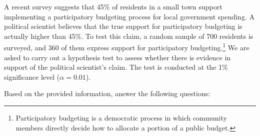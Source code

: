 \documentclass{article}
\begin{document}
A recent survey suggests that 45\% of residents in a small town support implementing a participatory budgeting process for local government spending. A political scientist believes that the true support for participatory budgeting is actually higher than 45\%. To test this claim, a random sample of 700 residents is surveyed, and 360 of them express support for participatory budgeting.\footnote{Participatory budgeting is a democratic process in which community members directly decide how to allocate a portion of a public budget.} We are asked to carry out a hypothesis test to assess whether there is evidence in support of the political scientist's claim. The test is conducted at the 1\% significance level ($\alpha=0.01$).

Based on the provided information, answer the following questions:
\end{document}
